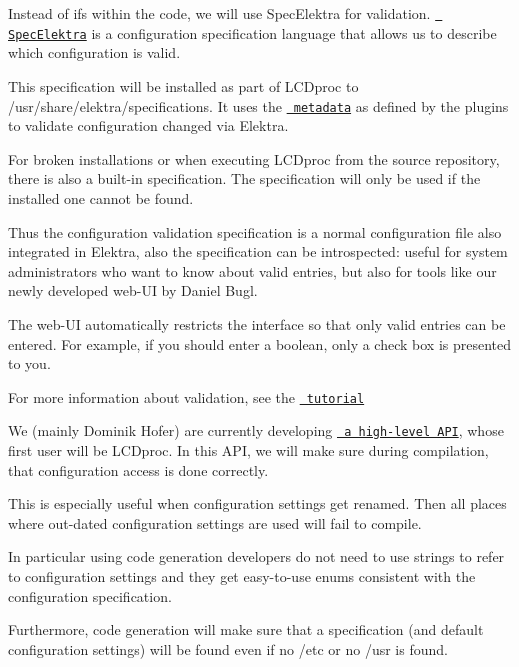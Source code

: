 Instead of {\ttfamily if}s within the code, we will use Spec\+Elektra for validation. \href{https://www.libelektra.org/manpages/elektra-glossary}{\texttt{ Spec\+Elektra}} is a configuration specification language that allows us to describe which configuration is valid.

This specification will be installed as part of L\+C\+Dproc to {\ttfamily /usr/share/elektra/specifications}. It uses the \href{https://www.libelektra.org/docgettingstarted/metadata}{\texttt{ metadata}} as defined by the plugins to validate configuration changed via Elektra.

For broken installations or when executing L\+C\+Dproc from the source repository, there is also a built-\/in specification. The specification will only be used if the installed one cannot be found.

Thus the configuration validation specification is a normal configuration file also integrated in Elektra, also the specification can be introspected\+: useful for system administrators who want to know about valid entries, but also for tools like our newly developed web-\/\+UI by Daniel Bugl.

The web-\/\+UI automatically restricts the interface so that only valid entries can be entered. For example, if you should enter a boolean, only a check box is presented to you.


\begin{DoxyItemize}
\item For more information about validation, see the \href{https://www.libelektra.org/tutorials/validate-configuration}{\texttt{ tutorial}}
\end{DoxyItemize}

We (mainly Dominik Hofer) are currently developing \href{https://www.libelektra.org/decisions/high-level-api}{\texttt{ a high-\/level A\+PI}}, whose first user will be L\+C\+Dproc. In this A\+PI, we will make sure during compilation, that configuration access is done correctly.

This is especially useful when configuration settings get renamed. Then all places where out-\/dated configuration settings are used will fail to compile.

In particular using code generation developers do not need to use strings to refer to configuration settings and they get easy-\/to-\/use enums consistent with the configuration specification.

Furthermore, code generation will make sure that a specification (and default configuration settings) will be found even if no {\ttfamily /etc} or no {\ttfamily /usr} is found.

